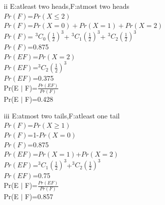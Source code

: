 \documentclass{article}
\begin{document}
\begin{enumerate}[label=13.\arabic{enumi}.\arabic{enumii}]
\begin{enumerate}
\item[ii] E:atleast two heads,F:atmost two heads\\
$Pr(F)$=$Pr(X\leq2)$\\
$Pr(F)$=$Pr(X=0)+Pr(X=1)+Pr(X=2)$\\
$Pr(F)$= $^{3}C_0 (\frac{1}{2})^{3}$+ $^{3}C_1 (\frac{1}{2})^{3}$+ $^{3}C_2 (\frac{1}{2})^{3}$\\
$Pr(F)$=0.875\\
$Pr(EF)$=$Pr(X=2)$\\
$Pr(EF)$=$^{3}C_2 (\frac{1}{2})^{3}$\\
$Pr(EF)$=0.375\\
Pr(E $\mid$ F)=$\frac{Pr(EF)}{Pr(F)}$\\
Pr(E $\mid$ F)=0.428\\
\end{enumerate}
\begin{enumerate}
\item[iii]E:atmost two tails,F:atleast one tail\\
$Pr(F)$=$Pr(X\geq1)$\\
$Pr(F)$=1-$Pr(X=0)$\\
$Pr(F)$=0.875\\
$Pr(EF)$=$Pr(X=1)$+$Pr(X=2)$\\
$Pr(EF)$=$^{3}C_1 (\frac{1}{2})^{3}$+$^{3}C_2 (\frac{1}{2})^{3}$\\
$Pr(EF)$=0.75\\
Pr(E $\mid$ F)=$\frac{Pr(EF)}{Pr(F)}$\\
Pr(E $\mid$ F)=0.857\\
\end{enumerate}
\end{enumerate}
\end{document}

